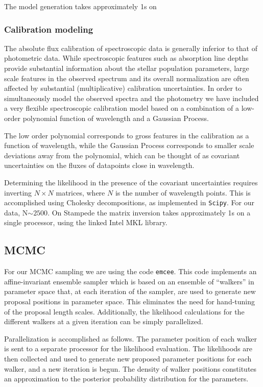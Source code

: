 The model generation takes approximately 1s on 

\subsubsection{Calibration modeling}
The absolute flux calibration of spectroscopic data is generally
inferior to that of photometric data.  While spectroscopic features
such as absorption line depths provide substantial information about
the stellar population parameters, large scale features in the
observed spectrum and its overall normalization are often affected by
substantial (multiplicative) calibration uncertainties. In order to
simultaneously model the observed spectra and the photometry we have
included a very flexible spectroscopic calibration model based on a
combination of a low-order polynomial function of wavelength and a
Gaussian Process.

The low order polynomial corresponds to gross features in the
calibration as a function of wavelength, while the Gaussian Process
corresponds to smaller scale deviations away from the polynomial,
which can be thought of as covariant uncertainties on the fluxes of
datapoints close in wavelength.

Determining the likelihood in the presence of the covariant
uncertainties requires inverting $N \times N$ matrices, where $N$ is
the number of wavelength points.  This is accomplished using Cholesky
decompositions, as implemented in \texttt{Scipy}.  For our data,
N$\sim 2500$.  On Stampede the matrix inversion takes approximately 1s
on a single processor, using the linked Intel MKL library.

\subsection{MCMC}
For our MCMC sampling we are using the code \texttt{emcee}.  This code
implements an affine-invariant ensemble sampler \citep{goodman_weare}
which is based on an ensemble of ``walkers'' in parameter space that,
at each iteration of the sampler, are used to generate new proposal
positions in parameter space.  This eliminates the need for
hand-tuning of the proposal length scales.  Additionally, the
likelihood calculations for the different walkers at a given iteration
can be simply parallelized.

Parallelization is accomplished as follows. The parameter position of
each walker is sent to a separate processor for the likelihood
evaluation. The likelihoods are then collected and used to generate
new proposed parameter positions for each walker, and a new iteration
is begun.  The density of walker positions constitutes an
approximation to the posterior probability distribution for the
parameters.


